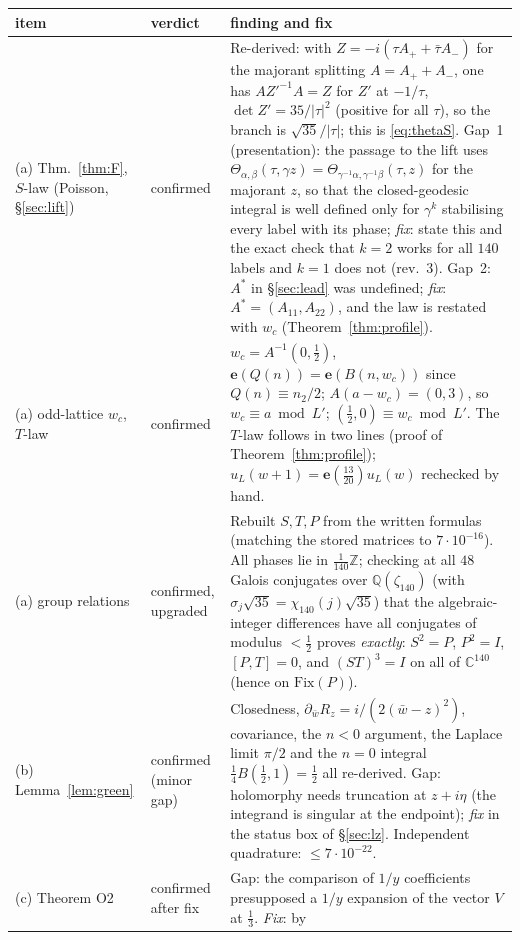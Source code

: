 \documentclass[11pt]{article}
\theoremstyle{definition}
\newcommand{\Q}{\mathbb{Q}}
\newcommand{\Z}{\mathbb{Z}}
\newcommand{\C}{\mathbb{C}}
\newcommand{\e}{\mathbf{e}}
\begin{document}
\begin{center}\small
\begin{longtable}{p{3.6cm}p{1.9cm}p{9.2cm}}\toprule
item & verdict & finding and fix\\\midrule\endhead
(a) Thm.~\ref{thm:F}, $S$-law (Poisson, \S\ref{sec:lift}) & confirmed & Re-derived: with $Z=-i(\tau A_++\bar\tau A_-)$ for the majorant splitting $A=A_++A_-$, one has
$AZ'^{-1}A=Z$ for $Z'$ at $-1/\tau$, $\det Z'=35/|\tau|^2$ (positive for all $\tau$), so the branch is $\sqrt{35}/|\tau|$; this is \eqref{eq:thetaS}. Gap~1 (presentation):
the passage to the lift uses $\Theta_{\alpha,\beta}(\tau,\gamma z)=\Theta_{\gamma^{-1}\alpha,\gamma^{-1}\beta}(\tau,z)$ for the majorant $z$, so that the closed-geodesic
integral is well defined only for $\gamma^k$ stabilising every label with its phase; \emph{fix}: state this and the exact check that $k=2$ works for all $140$
labels and $k=1$ does not (rev.~3). Gap~2: $A^*$ in \S\ref{sec:lead} was undefined; \emph{fix}: $A^*=(A_{11},A_{22})$, and the law is restated with $w_c$
(Theorem~\ref{thm:profile}).\\
(a) odd-lattice $w_c$, $T$-law & confirmed & $w_c=A^{-1}(0,\tfrac12)$, $\e(Q(n))=\e(B(n,w_c))$ since $Q(n)\equiv n_2/2$; $A(a-w_c)=(0,3)$, so $w_c\equiv a\bmod L'$;
$(\tfrac12,0)\equiv w_c\bmod L'$. The $T$-law follows in two lines (proof of Theorem~\ref{thm:profile}); $u_L(w+1)=\e(\tfrac{13}{20})u_L(w)$ rechecked by hand.\\
(a) group relations & confirmed, upgraded & Rebuilt $S,T,P$ from the written formulas (matching the stored matrices to $7\cdot10^{-16}$). All phases lie in
$\tfrac1{140}\Z$; checking at all $48$ Galois conjugates over $\Q(\zeta_{140})$ (with $\sigma_j\sqrt{35}=\chi_{140}(j)\sqrt{35}$) that the algebraic-integer differences have
all conjugates of modulus $<\tfrac12$ proves \emph{exactly}: $S^2=P$, $P^2=I$, $[P,T]=0$, and $(ST)^3=I$ on all of $\C^{140}$ (hence on $\mathrm{Fix}(P)$).\\
(b) Lemma~\ref{lem:green} & confirmed (minor gap) & Closedness, $\partial_{\bar w}R_z=i/(2(\bar w-z)^2)$, covariance, the $n<0$ argument, the Laplace limit $\pi/2$ and the
$n=0$ integral $\tfrac14B(\tfrac12,1)=\tfrac12$ all re-derived. Gap: holomorphy needs truncation at $z+i\eta$ (the integrand is singular at the endpoint); \emph{fix} in
the status box of \S\ref{sec:lz}. Independent quadrature: $\le7\cdot10^{-22}$.\\
(c) Theorem O2 & confirmed after fix & Gap: the comparison of $1/y$ coefficients presupposed a $1/y$ expansion of the vector $V$ at $\tfrac13$. \emph{Fix}: by

\end{longtable}
\end{center}
\end{document}
